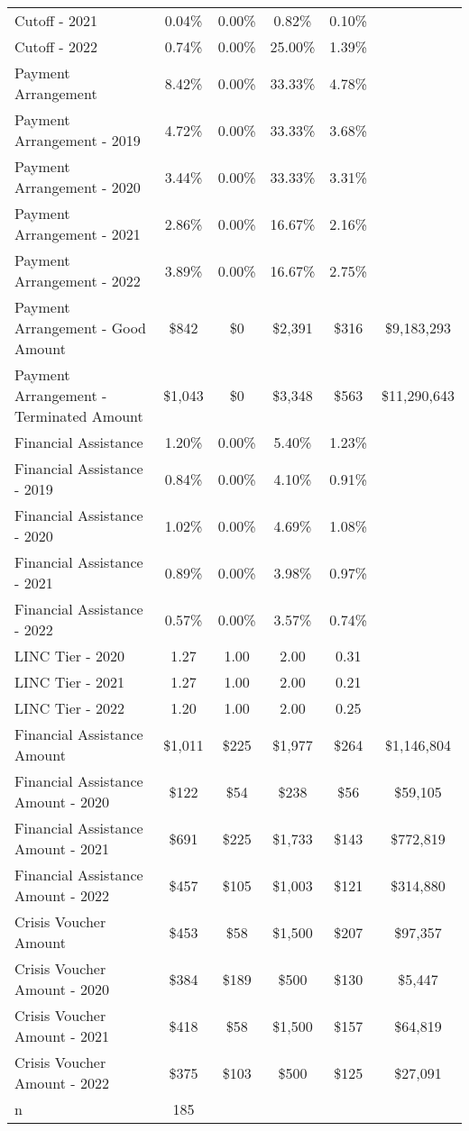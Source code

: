 \begin{tabular}{l|c|c|c|c|c}
\quad Cutoff - 2021 & 0.04\% & 0.00\% & 0.82\% & 0.10\% \\
\quad Cutoff - 2022 & 0.74\% & 0.00\% & 25.00\% & 1.39\% \\
\midrule 
Payment Arrangement & 8.42\% & 0.00\% & 33.33\% & 4.78\% \\
\quad Payment Arrangement - 2019 & 4.72\% & 0.00\% & 33.33\% & 3.68\% \\
\quad Payment Arrangement - 2020 & 3.44\% & 0.00\% & 33.33\% & 3.31\% \\
\quad Payment Arrangement - 2021 & 2.86\% & 0.00\% & 16.67\% & 2.16\% \\
\quad Payment Arrangement - 2022 & 3.89\% & 0.00\% & 16.67\% & 2.75\% \\
\quad Payment Arrangement - Good Amount & \$842 & \$0 & \$2,391 & \$316 & \$9,183,293 \\
\quad Payment Arrangement - Terminated Amount & \$1,043 & \$0 & \$3,348 & \$563 & \$11,290,643 \\
\midrule 
Financial Assistance & 1.20\% & 0.00\% & 5.40\% & 1.23\% \\
\quad Financial Assistance - 2019 & 0.84\% & 0.00\% & 4.10\% & 0.91\% \\
\quad Financial Assistance - 2020 & 1.02\% & 0.00\% & 4.69\% & 1.08\% \\
\quad Financial Assistance - 2021 & 0.89\% & 0.00\% & 3.98\% & 0.97\% \\
\quad Financial Assistance - 2022 & 0.57\% & 0.00\% & 3.57\% & 0.74\% \\
\midrule 
LINC Tier - 2020 & 1.27 & 1.00 & 2.00 & 0.31 \\
LINC Tier - 2021 & 1.27 & 1.00 & 2.00 & 0.21 \\
LINC Tier - 2022 & 1.20 & 1.00 & 2.00 & 0.25 \\
\midrule 
Financial Assistance Amount & \$1,011 & \$225 & \$1,977 & \$264 & \$1,146,804 \\
\quad Financial Assistance Amount - 2020 & \$122 & \$54 & \$238 & \$56 & \$59,105 \\
\quad Financial Assistance Amount - 2021 & \$691 & \$225 & \$1,733 & \$143 & \$772,819 \\
\quad Financial Assistance Amount - 2022 & \$457 & \$105 & \$1,003 & \$121 & \$314,880 \\
\midrule 
Crisis Voucher Amount & \$453 & \$58 & \$1,500 & \$207 & \$97,357 \\
\quad Crisis Voucher Amount - 2020 & \$384 & \$189 & \$500 & \$130 & \$5,447 \\
\quad Crisis Voucher Amount - 2021 & \$418 & \$58 & \$1,500 & \$157 & \$64,819 \\
\quad Crisis Voucher Amount - 2022 & \$375 & \$103 & \$500 & \$125 & \$27,091 \\
\midrule 
n & 185 &  &  &  &  \\
\midrule 
\bottomrule 
\end{tabular}
